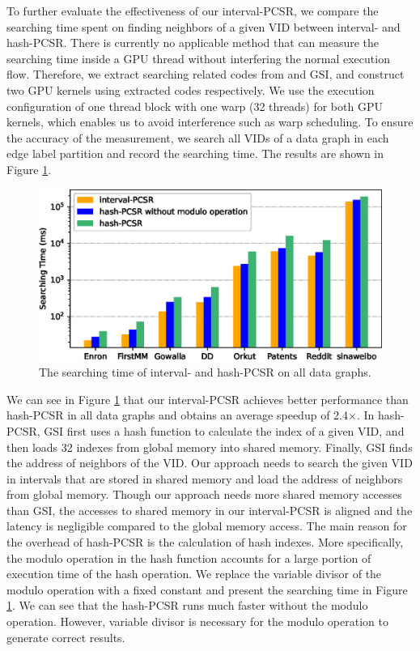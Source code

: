 To further evaluate the effectiveness of our interval-PCSR, we compare the searching time spent on finding neighbors of a given VID between
interval- and hash-PCSR. There is currently no applicable method that can measure the searching time inside a GPU thread without
interfering the normal execution flow. Therefore, we extract searching related codes from \SystemName and GSI, and construct two GPU
kernels using extracted codes respectively. We use the execution configuration of one thread block with one warp (32 threads) for both GPU
kernels, which enables us to avoid interference such as warp scheduling. To ensure the accuracy of the measurement, we search all VIDs of a
data graph in each edge label partition and record the searching time. The results are shown in Figure \ref{fig:searchtime}.
\begin{figure}
\centering
\includegraphics[width=\columnwidth]{./figure/accesstime.eps}
\caption{The searching time of interval- and hash-PCSR on all data graphs.}	
\label{fig:searchtime}
\end{figure}

We can see in Figure \ref{fig:searchtime} that our interval-PCSR achieves better performance than hash-PCSR in all data graphs and obtains
an average speedup of 2.4$\times$. In hash-PCSR, GSI first uses a hash function to calculate the index of a given VID, and then loads 32
indexes from global memory into shared memory. Finally, GSI finds the address of neighbors of the VID. Our approach needs to search the
given VID in intervals that are stored in shared memory and load the address of neighbors from global memory. Though our approach needs
more shared memory accesses than GSI, the accesses to shared memory in our interval-PCSR is aligned and the latency is negligible compared
to the global memory access. The main reason for the overhead of hash-PCSR is the calculation of hash indexes. More specifically, the
modulo operation in the hash function accounts for a large portion of execution time of the hash operation. We replace the variable divisor
of the modulo operation with a fixed constant and present the searching time in Figure \ref{fig:searchtime}. We can see that the hash-PCSR
runs much faster without the modulo operation. However, variable divisor is necessary for the modulo operation to generate correct results.


